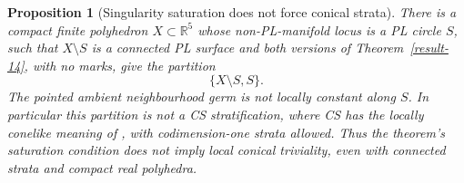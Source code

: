 \documentclass[11pt,a4paper]{article}
\newtheorem{proposition}[theorem]{Proposition}
\theoremstyle{definition}
\begin{document}
\begin{proposition}[Singularity saturation does not force conical strata]
\label{result-intrinsic-not-cs}
There is a compact finite polyhedron $X\subset\mathbb R^5$ whose
non-PL-manifold locus is a PL circle $S$, such that $X\setminus S$ is a
connected PL surface and both versions of
Theorem~\ref{result-14}, with no marks, give the partition
\[
                 \{X\setminus S,S\}.
\]
The pointed ambient neighbourhood germ is not locally constant along
$S$.  In particular this partition is not a CS stratification, where
CS has the locally conelike meaning of
\cite[Definition 1.10, pp.~5--6]{ChataurSaralegiTanre2019},
with codimension-one strata allowed.  Thus the theorem's saturation condition does not imply
local conical triviality, even with connected strata and compact
real polyhedra.
\end{proposition}
\end{document}
